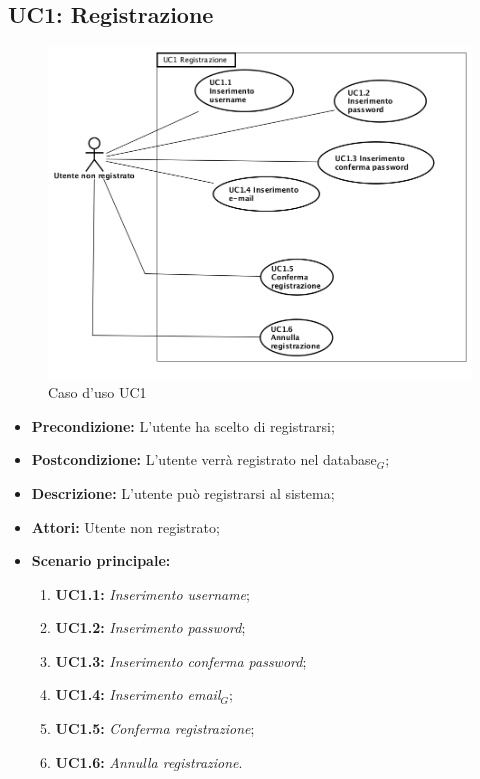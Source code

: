 \newpage
\subsection{ UC1: Registrazione}

\begin{figure}[h]
	\begin{center}
	\includegraphics[scale=0.4]{diagram/UC1.png}
	\caption{Caso d'uso UC1}
	\end{center}
\end{figure}
\begin{itemize}
	\item \textbf{Precondizione:} L'utente ha scelto di registrarsi;
	\item \textbf{Postcondizione:} L'utente verrà registrato nel database$_G$;
	\item \textbf{Descrizione:} L'utente può registrarsi al sistema;
	\item \textbf{Attori:} Utente non registrato;
	\item \textbf{Scenario principale:}
	\begin{enumerate}
		\item \textbf{ UC1.1:} \textit{ Inserimento username};
		\item \textbf{ UC1.2:} \textit{ Inserimento password};
		\item \textbf{ UC1.3:} \textit{ Inserimento conferma password};
		\item \textbf{ UC1.4:} \textit{ Inserimento email$_G$};
		\item \textbf{ UC1.5:} \textit{ Conferma registrazione};
		\item \textbf{ UC1.6:} \textit{ Annulla registrazione}.
	\end{enumerate}
\end{itemize}
